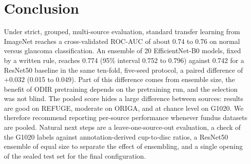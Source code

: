\section{Conclusion}
\label{sec:conclusion}
Under strict, grouped, multi-source evaluation, standard transfer learning from ImageNet reaches a cross-validated ROC-AUC of about 0.74 to 0.76 on normal versus glaucoma classification. An ensemble of 20 EfficientNet-B0 models, fixed by a written rule, reaches 0.774 (95\% interval 0.752 to 0.796) against 0.742 for a ResNet50 baseline in the same ten-fold, five-seed protocol, a paired difference of $+0.032$ (0.015 to 0.049). Part of this difference comes from ensemble size, the benefit of ODIR pretraining depends on the pretraining run, and the selection was not blind. The pooled score hides a large difference between sources: results are good on REFUGE, moderate on ORIGA, and at chance level on G1020. We therefore recommend reporting per-source performance whenever fundus datasets are pooled. Natural next steps are a leave-one-source-out evaluation, a check of the G1020 labels against annotation-derived cup-to-disc ratios, a ResNet50 ensemble of equal size to separate the effect of ensembling, and a single opening of the sealed test set for the final configuration.
